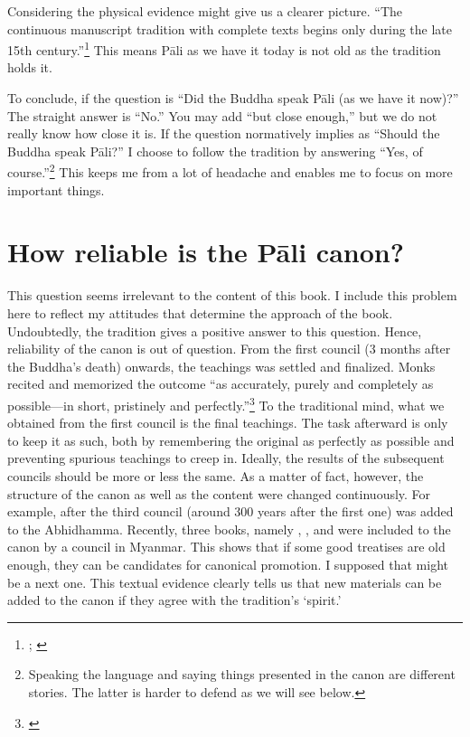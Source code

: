 Considering the physical evidence might give us a clearer picture. ``The continuous manuscript tradition with complete texts begins only during the late 15th century.''\footnote{\citealp[p.~4]{hinuber:literature}; \citealp[See also][p.~xxv]{geiger:grammar}} This means P\=ali as we have it today is not old as the tradition holds it.

To conclude, if the question is ``Did the Buddha speak P\=ali (as we have it now)?'' The straight answer is ``No.'' You may add ``but close enough,'' but we do not really know how close it is. If the question normatively implies as ``Should the Buddha speak P\=ali?'' I choose to follow the tradition by answering ``Yes, of course.''\footnote{Speaking the language and saying things presented in the canon are different stories. The latter is harder to defend as we will see below.} This keeps me from a lot of headache and enables me to focus on more important things.

{}
\section*{How reliable is the P\=ali canon?}
This question seems irrelevant to the content of this book. I include this problem here to reflect my attitudes that determine the approach of the book. Undoubtedly, the tradition gives a positive answer to this question. Hence, reliability of the canon is out of question. From the first council (3 months after the Buddha's death) onwards, the teachings was settled and finalized. Monks recited and memorized the outcome ``as accurately, purely and completely as possible---in short, pristinely and perfectly.''\footnote{\citealp[p.~19]{payutto:canon}} To the traditional mind, what we obtained from the first council is the final teachings. The task afterward is only to keep it as such, both by remembering the original as perfectly as possible and preventing spurious teachings to creep in. Ideally, the results of the subsequent councils should be more or less the same. As a matter of fact, however, the structure of the canon as well as the content were changed continuously. For example, after the third council (around 300 years after the first one)  was added to the Abhidhamma. Recently, three books, namely , , and  were included to the canon by a council in Myanmar. This shows that if some good treatises are old enough, they can be candidates for canonical promotion. I supposed that  might be a next one. This textual evidence clearly tells us that new materials can be added to the canon if they agree with the tradition's `spirit.'

